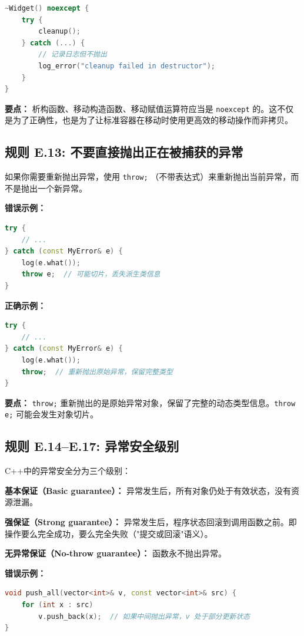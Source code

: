 \begin{lstlisting}[language=C++]
~Widget() noexcept {
    try {
        cleanup();
    } catch (...) {
        // 记录日志但不抛出
        log_error("cleanup failed in destructor");
    }
}
\end{lstlisting}

\textbf{要点：} 析构函数、移动构造函数、移动赋值运算符应当是 \texttt{noexcept} 的。这不仅是为了正确性，也是为了让标准容器在移动时使用更高效的移动操作而非拷贝。

\subsection*{\textbf{规则 E.13:} 不要直接抛出正在被捕获的异常}

如果你需要重新抛出异常，使用 \texttt{throw;} （不带表达式）来重新抛出当前异常，而不是抛出一个新异常。

\textbf{错误示例：}

\begin{lstlisting}[language=C++]
try {
    // ...
} catch (const MyError& e) {
    log(e.what());
    throw e;  // 可能切片，丢失派生类信息
}
\end{lstlisting}

\textbf{正确示例：}

\begin{lstlisting}[language=C++]
try {
    // ...
} catch (const MyError& e) {
    log(e.what());
    throw;  // 重新抛出原始异常，保留完整类型
}
\end{lstlisting}

\textbf{要点：} \texttt{throw;} 重新抛出的是原始异常对象，保留了完整的动态类型信息。\texttt{throw e;} 可能会发生对象切片。

\subsection*{\textbf{规则 E.14--E.17:} 异常安全级别}

C++中的异常安全分为三个级别：

\textbf{基本保证（Basic guarantee）：} 异常发生后，所有对象仍处于有效状态，没有资源泄漏。

\textbf{强保证（Strong guarantee）：} 异常发生后，程序状态回滚到调用函数之前。即操作要么完全成功，要么完全失败（"提交或回滚"语义）。

\textbf{无异常保证（No-throw guarantee）：} 函数永不抛出异常。

\textbf{错误示例：}

\begin{lstlisting}[language=C++]
void push_all(vector<int>& v, const vector<int>& src) {
    for (int x : src)
        v.push_back(x);  // 如果中间抛出异常，v 处于部分更新状态
}
\end{lstlisting}

